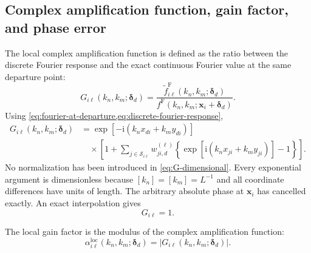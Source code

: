 \documentclass[11pt]{article}
\numberwithin{equation}{section}
\newcommand{\ii}{\mathrm{i}}
\begin{document}
\subsection{Complex amplification function, gain factor, and phase error}

The local complex amplification function is defined as the ratio between the discrete Fourier response and the exact continuous Fourier value at the same departure point:
\begin{equation}
    \boxed{
    G_{i\ell}\!\left(k_n,k_m;\bm{\delta}_d\right)
    =
    \frac{
        \widetilde f^{\mathrm F}_{i\ell}
        \!\left(k_n,k_m;\bm{\delta}_d\right)
    }{
        f^{\mathrm F}\!\left(k_n,k_m;\bm{x}_i+\bm{\delta}_d\right)
    }.
    }
    \label{eq:G-definition}
\end{equation}
Using \cref{eq:fourier-at-departure,eq:discrete-fourier-response},
\begin{equation}
\boxed{
\begin{aligned}
    G_{i\ell}\!\left(k_n,k_m;\bm{\delta}_d\right)
    &=
    \exp\!\left[-\ii\left(k_nx_{di}+k_my_{di}\right)\right]
    \\
    &\quad\times
    \left[
        1+
        \sum_{j\in\mathcal S_{i\ell}}
        w_{ji,d}^{(\ell)}
        \left\{
            \exp\!\left[\ii\left(k_nx_{ji}+k_my_{ji}\right)\right]-1
        \right\}
    \right].
\end{aligned}
}
\label{eq:G-dimensional}
\end{equation}
No normalization has been introduced in \cref{eq:G-dimensional}. Every exponential argument is dimensionless because $[k_n]=[k_m]=L^{-1}$ and all coordinate differences have units of length. The arbitrary absolute phase at $\bm{x}_i$ has cancelled exactly. An exact interpolation gives
\begin{equation}
    G_{i\ell}=1.
    \label{eq:exact-G}
\end{equation}

The local gain factor is the modulus of the complex amplification function:
\begin{equation}
    \boxed{
    \alpha_{i\ell}^{\mathrm{loc}}
    \!\left(k_n,k_m;\bm{\delta}_d\right)
    =
    \left|
        G_{i\ell}\!\left(k_n,k_m;\bm{\delta}_d\right)
    \right|.
    }
    \label{eq:local-gain}
\end{equation}
\end{document}
